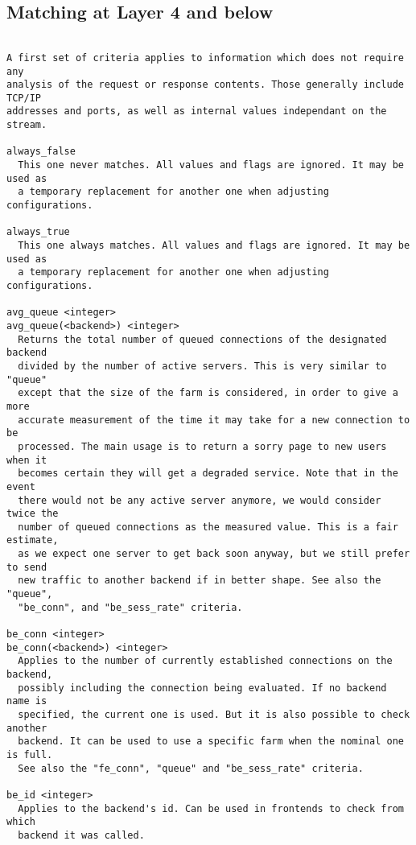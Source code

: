 
\subsection{Matching at Layer 4 and below}

\begin{verbatim}

A first set of criteria applies to information which does not require any
analysis of the request or response contents. Those generally include TCP/IP
addresses and ports, as well as internal values independant on the stream.

always_false
  This one never matches. All values and flags are ignored. It may be used as
  a temporary replacement for another one when adjusting configurations.

always_true
  This one always matches. All values and flags are ignored. It may be used as
  a temporary replacement for another one when adjusting configurations.

avg_queue <integer>
avg_queue(<backend>) <integer>
  Returns the total number of queued connections of the designated backend
  divided by the number of active servers. This is very similar to "queue"
  except that the size of the farm is considered, in order to give a more
  accurate measurement of the time it may take for a new connection to be
  processed. The main usage is to return a sorry page to new users when it
  becomes certain they will get a degraded service. Note that in the event
  there would not be any active server anymore, we would consider twice the
  number of queued connections as the measured value. This is a fair estimate,
  as we expect one server to get back soon anyway, but we still prefer to send
  new traffic to another backend if in better shape. See also the "queue",
  "be_conn", and "be_sess_rate" criteria.

be_conn <integer>
be_conn(<backend>) <integer>
  Applies to the number of currently established connections on the backend,
  possibly including the connection being evaluated. If no backend name is
  specified, the current one is used. But it is also possible to check another
  backend. It can be used to use a specific farm when the nominal one is full.
  See also the "fe_conn", "queue" and "be_sess_rate" criteria.

be_id <integer>
  Applies to the backend's id. Can be used in frontends to check from which
  backend it was called.


\end{verbatim}
